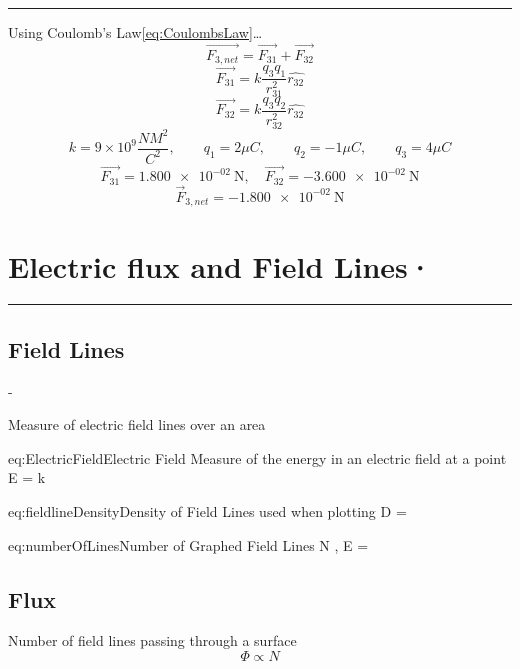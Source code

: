\begin{example}
\begin{center}
\end{center}

\hrule
\vspace{.5cm}
Using Coulomb's Law\ref{eq:CoulombsLaw}\dots
\[
\vec{F_{3,net}} = \vec{F_{31}} + \vec{F_{32}} \]
\[\vec{F_{31}} = k \frac{q_3q_1}{r_{31}^2} \hat{r_{32}}\]
\[\vec{F_{32}} = k \frac{q_3q_2}{r_{32}^2} \hat{r_{32}}\]
\[k = 9 \times 10^9 \frac{NM^2}{C^2},  \qquad q_1 = 2\mu C, \qquad q_2 = -1 \mu C, \qquad q_3 = 4\mu C \]
\[\vec{F_{31}} = \SI{1.800e-02}{\N}, \quad \vec{F_{32}} = \SI{-3.600e-02}{\N}\]
\[\boxed{\vec{F}_{3, net} =  \SI{-1.800e-02}{\N}}\]
\end{example}


\pagebreak
\section{Electric flux and Field Lines·}
\hrule
\vspace{.5cm}

\subsection{Field Lines}
\begin{list}{-}{}
\item Measure of electric field lines over an area
\end{list}

\begin{eqboxed}{eq:ElectricField}{Electric Field}
{Measure of the energy in an electric field at a point}
E = k 
\end{eqboxed}

\begin{eqboxed}{eq:fieldlineDensity}{Density of Field Lines}
{used when plotting}
D = 
\end{eqboxed}

\begin{eqboxed}{eq:numberOfLines}{Number of Graphed Field Lines }
{}
N \equiv {}, \quad E = 
\end{eqboxed}
\subsection{Flux}
Number of field lines passing through a surface 
\[\Phi \propto N\]

